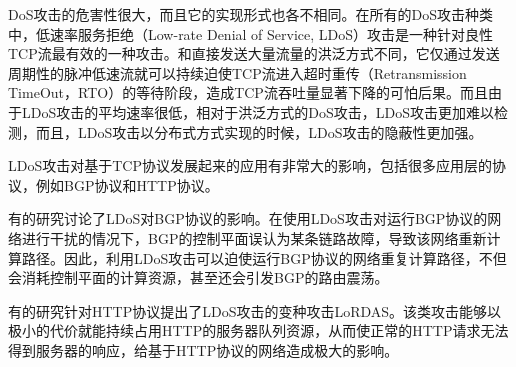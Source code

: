 DoS攻击的危害性很大，而且它的实现形式也各不相同。在所有的DoS攻击种类中，低速率服务拒绝（Low-rate Denial of Service, LDoS）攻击\cite{LDoS}是一种针对良性TCP流最有效的一种攻击。和直接发送大量流量的洪泛方式不同，它仅通过发送周期性的脉冲低速流就可以持续迫使TCP流进入超时重传（Retransmission TimeOut，RTO）的等待阶段，造成TCP流吞吐量显著下降的可怕后果。而且由于LDoS攻击的平均速率很低，相对于洪泛方式的DoS攻击，LDoS攻击更加难以检测，而且，LDoS攻击以分布式方式实现的时候，LDoS攻击的隐蔽性更加强。

LDoS攻击对基于TCP协议发展起来的应用有非常大的影响，包括很多应用层的协议，例如BGP协议和HTTP协议。

有的研究\cite{b2}讨论了LDoS对BGP协议的影响。在使用LDoS攻击对运行BGP协议的网络进行干扰的情况下，BGP的控制平面误认为某条链路故障，导致该网络重新计算路径。因此，利用LDoS攻击可以迫使运行BGP协议的网络重复计算路径，不但会消耗控制平面的计算资源，甚至还会引发BGP的路由震荡。

有的研究\cite{Maci2007LoRDAS}针对HTTP协议提出了LDoS攻击的变种攻击LoRDAS。该类攻击能够以极小的代价就能持续占用HTTP的服务器队列资源，从而使正常的HTTP请求无法得到服务器的响应，给基于HTTP协议的网络造成极大的影响。


